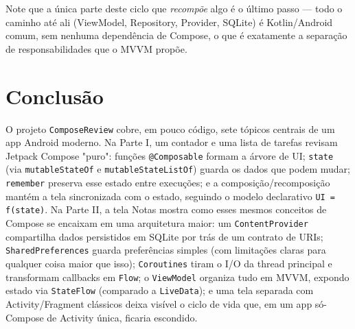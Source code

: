 \documentclass[11pt,a4paper]{article}
\begin{document}
Note que a única parte deste ciclo que \emph{recompõe} algo é o último
passo — todo o caminho até ali (ViewModel, Repository, Provider,
SQLite) é Kotlin/Android comum, sem nenhuma dependência de Compose, o
que é exatamente a separação de responsabilidades que o MVVM propõe.

\section{Conclusão}

O projeto \texttt{ComposeReview} cobre, em pouco código, sete tópicos
centrais de um app Android moderno. Na Parte I, um contador e uma lista
de tarefas revisam Jetpack Compose "puro": funções \texttt{@Composable}
formam a árvore de UI; \texttt{state} (via \texttt{mutableStateOf} e
\texttt{mutableStateListOf}) guarda os dados que podem mudar;
\texttt{remember} preserva esse estado entre execuções; e a
composição/recomposição mantém a tela sincronizada com o estado, seguindo
o modelo declarativo \texttt{UI = f(state)}. Na Parte II, a tela Notas
mostra como esses mesmos conceitos de Compose se encaixam em uma
arquitetura maior: um \texttt{ContentProvider} compartilha dados
persistidos em SQLite por trás de um contrato de URIs;
\texttt{SharedPreferences} guarda preferências simples (com limitações
claras para qualquer coisa maior que isso); \texttt{Coroutines} tiram
o I/O da thread principal e transformam callbacks em \texttt{Flow};
o \texttt{ViewModel} organiza tudo em MVVM, expondo estado via
\texttt{StateFlow} (comparado a \texttt{LiveData}); e uma tela separada
com Activity/Fragment clássicos deixa visível o ciclo de vida que, em
um app só-Compose de Activity única, ficaria escondido.
\end{document}
